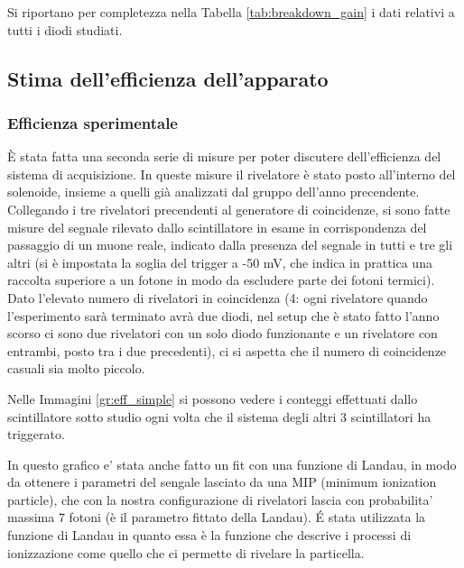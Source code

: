 Si riportano per completezza nella Tabella \ref{tab:breakdown_gain} i dati relativi a tutti i diodi studiati.


\subsection{Stima dell'efficienza dell'apparato}
\label{sec:efficiency}
\subsubsection{Efficienza sperimentale}
\`E stata fatta una seconda serie di misure per poter discutere dell'efficienza del sistema di acquisizione. In queste misure il rivelatore \`e stato posto all'interno del solenoide, insieme a quelli gi\`a analizzati dal gruppo dell'anno precendente. Collegando i tre rivelatori precendenti al generatore di coincidenze, si sono fatte misure del segnale rilevato dallo scintillatore in esame in corrispondenza del passaggio di un muone reale, indicato dalla presenza del segnale in tutti e tre gli altri (si è impostata la soglia del trigger a -50 mV, che indica in prattica una raccolta superiore a un fotone in modo da escludere parte dei fotoni termici). Dato l'elevato numero di rivelatori in coincidenza (4: ogni rivelatore quando l'esperimento sarà terminato avrà due diodi, nel setup che è stato fatto l'anno scorso ci sono due rivelatori con un solo diodo funzionante e un rivelatore con entrambi, posto tra i due precedenti), ci si aspetta che il numero di coincidenze casuali sia molto piccolo.

Nelle Immagini \ref{gr:eff_simple} si possono vedere i conteggi effettuati dallo scintillatore sotto studio ogni volta che il sistema degli altri 3 scintillatori ha triggerato.


In questo grafico e' stata anche fatto un fit con una funzione di Landau, in modo da ottenere i parametri del sengale lasciato da una MIP (minimum ionization particle), che con la nostra configurazione di rivelatori lascia con probabilita' massima 7 fotoni (è il parametro fittato della Landau). \'E stata utilizzata la funzione di Landau in quanto essa è la funzione che descrive i processi di ionizzazione come quello che ci permette di rivelare la particella.


